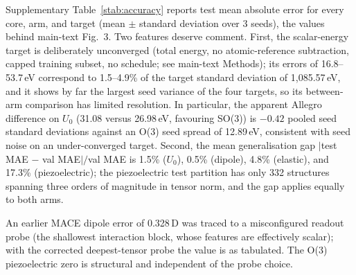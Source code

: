 Supplementary Table~\ref{stab:accuracy} reports test mean absolute error for every core, arm, and target (mean $\pm$ standard deviation over 3 seeds), the values behind main-text Fig.~3. Two features deserve comment. First, the scalar-energy target is deliberately unconverged (total energy, no atomic-reference subtraction, capped training subset, no schedule; see main-text Methods); its errors of 16.8--53.7\,eV correspond to 1.5--4.9\% of the target standard deviation of 1,085.57\,eV, and it shows by far the largest seed variance of the four targets, so its between-arm comparison has limited resolution. In particular, the apparent Allegro difference on $U_0$ (31.08 versus 26.98\,eV, favouring SO(3)) is $-0.42$ pooled seed standard deviations against an O(3) seed spread of 12.89\,eV, consistent with seed noise on an under-converged target. Second, the mean generalisation gap $|$test MAE $-$ val MAE$|/$val MAE is 1.5\% ($U_0$), 0.5\% (dipole), 4.8\% (elastic), and 17.3\% (piezoelectric); the piezoelectric test partition has only 332 structures spanning three orders of magnitude in tensor norm, and the gap applies equally to both arms.

An earlier MACE dipole error of 0.328\,D was traced to a misconfigured readout probe (the shallowest interaction block, whose features are effectively scalar); with the corrected deepest-tensor probe the value is as tabulated. The O(3) piezoelectric zero is structural and independent of the probe choice.

